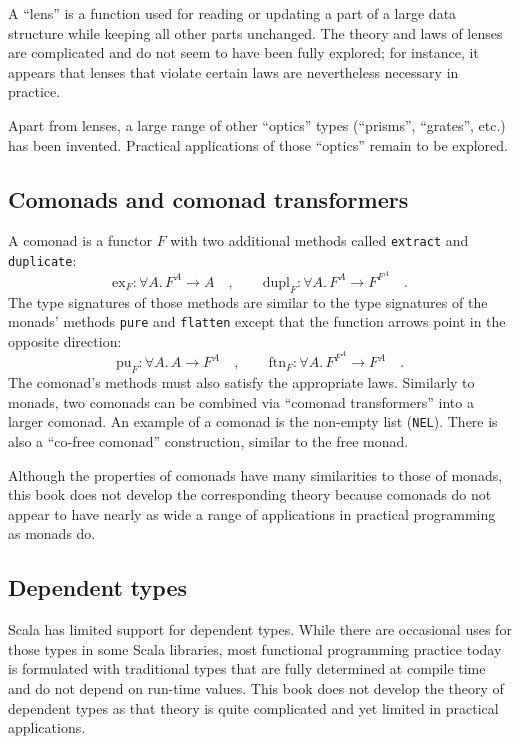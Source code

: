 A \textsf{``}lens\textsf{''} is a function used for reading or updating a part of
a large data structure while keeping all other parts unchanged. The
theory and laws of lenses are complicated and do not seem to have
been fully explored; for instance, it appears that lenses that violate
certain laws are nevertheless necessary in practice. 

Apart from lenses, a large range of other \textsf{``}optics\textsf{''} types (\textsf{``}prisms\textsf{''},
\textsf{``}grates\textsf{''}, etc.) has been invented. Practical applications of those
\textsf{``}optics\textsf{''} remain to be explored.

\subsection{Comonads and comonad transformers}

A comonad is a functor $F$ with two additional methods called \lstinline!extract!
and \lstinline!duplicate!:
\[
\text{ex}_{F}:\forall A.\,F^{A}\rightarrow A\quad,\quad\quad\text{dupl}_{F}:\forall A.\,F^{A}\rightarrow F^{F^{A}}\quad.
\]
The type signatures of those methods are similar to the type signatures
of the monads\textsf{'} methods \lstinline!pure! and \lstinline!flatten!
except that the function arrows point in the opposite direction:
\[
\text{pu}_{F}:\forall A.\,A\rightarrow F^{A}\quad,\quad\quad\text{ftn}_{F}:\forall A.\,F^{F^{A}}\rightarrow F^{A}\quad.
\]
The comonad\textsf{'}s methods must also satisfy the appropriate laws. Similarly
to monads, two comonads can be combined via \textsf{``}comonad transformers\textsf{''}
into a larger comonad. An example of a comonad is the non-empty list
(\lstinline!NEL!). There is also a \textsf{``}co-free comonad\textsf{''} construction,
similar to the free monad.

Although the properties of comonads have many similarities to those
of monads, this book does not develop the corresponding theory because
comonads do not appear to have nearly as wide a range of applications
in practical programming as monads do.

\subsection{Dependent types}

Scala has limited support for dependent types.
While there are occasional uses for those types in some Scala libraries,
most functional programming practice today is formulated with traditional
types that are fully determined at compile time and do not depend
on run-time values. This book does not develop the theory of dependent
types as that theory is quite complicated and yet limited in practical
applications.

